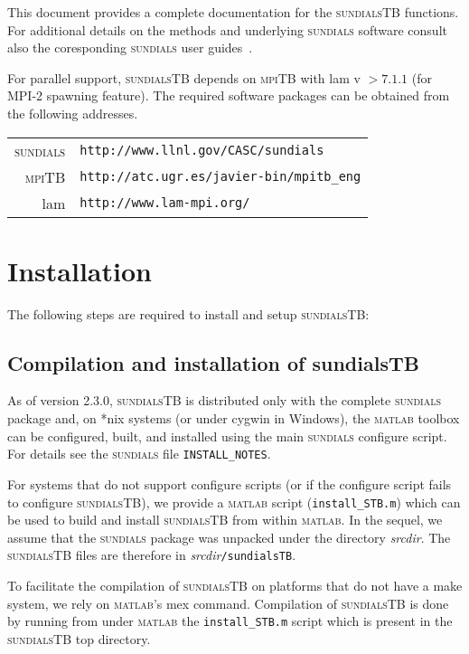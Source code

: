 \documentclass[titlepage,10pt]{article}
\newcommand{\sundialsTB}{{\normalfont\scshape sundialsTB}}
\newcommand{\sundials}{{\normalfont\scshape sundials}}
\newcommand{\matlab}{{\normalfont\scshape matlab}}
\newcommand{\mpiTB}{{\normalfont\scshape mpiTB}}
\begin{document}
This document provides a complete documentation for the {\sundialsTB} functions.
For additional details on the methods and underlying {\sundials} software consult
also the coresponding {\sundials} user guides~\cite{cvodes_ug,idas_ug,kinsol_ug}.

\vspace{0.15in}
For parallel support, {\sundialsTB} depends on {\mpiTB} with {\sc lam} v $> 7.1.1$ (for MPI-2 spawning feature).
The required software packages can be obtained from the following addresses.
%
\begin{center}
\begin{tabular}{rl}
{\sundials} & {\tt http://www.llnl.gov/CASC/sundials} \\
{\mpiTB}    & {\tt http://atc.ugr.es/javier-bin/mpitb\_eng}\\
{\sc lam}   & {\tt http://www.lam-mpi.org/}
\end{tabular}
\end{center}

\section{Installation} 

The following steps are required to install and setup {\sundialsTB}:

\subsection{Compilation and installation of sundialsTB}

As of version 2.3.0, {\sundialsTB} is distributed only with the complete {\sundials} package
and, on *nix systems (or under cygwin in Windows), the {\matlab} toolbox can be configured,
built, and installed using the main {\sundials} configure script. For details see the
{\sundials} file {\tt INSTALL\_NOTES}. 

For systems that do not support configure scripts (or if the configure script fails to
configure {\sundialsTB}), we provide a {\matlab} script ({\tt install\_STB.m}) which can be used
to build and install {\sundialsTB} from within {\matlab}. In the sequel, we assume that the 
{\sundials} package was unpacked under the directory {\em srcdir}. The {\sundialsTB} files are 
therefore in {\em srcdir}{\tt /sundialsTB}. 

To facilitate the compilation of {\sundialsTB} on platforms that do not have
a make system, we rely on {\matlab}'s mex command. Compilation of {\sundialsTB}
is done by running from under {\matlab} the {\tt install\_STB.m} script which is
present in the {\sundialsTB} top directory.
\end{document}
